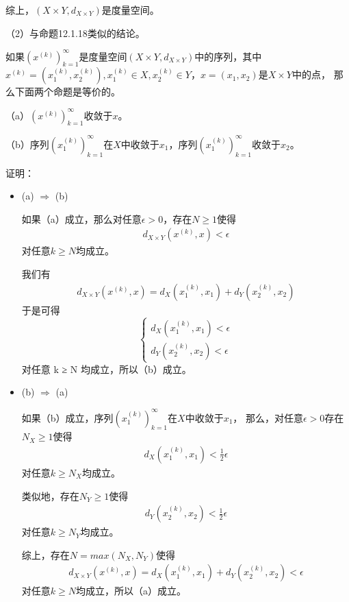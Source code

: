 \documentclass{article}
\begin{document}
综上，$(X \times Y, d_{X \times Y})$是度量空间。

（2）与命题12.1.18类似的结论。

如果$(x^{(k)})_{k = 1}^\infty$是度量空间$(X \times Y, d_{X \times Y})$中的序列，其中
$x^{(k)} = (x_1^{(k)}, x_2^{(k)}), x_1^{(k)} \in X, x_2^{(k)} \in Y$，$x = (x_1, x_2)$是$X \times Y$中的点，
那么下面两个命题是等价的。

（a）$(x^{(k)})_{k = 1}^\infty$收敛于$x$。

（b）序列$(x_1^{(k)})_{k = 1}^\infty$在$X$中收敛于$x_1$，序列$(x_1^{(k)})_{k = 1}^\infty$收敛于$x_2$。

证明：

\begin{itemize}
  \item (a) $\Rightarrow$ (b)

        如果（a）成立，那么对任意$\epsilon > 0$，存在$N \geq 1$使得
        \begin{align*}
          d_{X \times Y}(x^{(k)}, x) < \epsilon
        \end{align*}
        对任意$k \geq N$均成立。

        我们有
        \begin{align*}
          d_{X \times Y}(x^{(k)}, x) = d_X(x_1^{(k)}, x_1) + d_Y(x_2^{(k)}, x_2)
        \end{align*}
        于是可得
        \begin{equation*}
          \begin{cases}
            d_X(x_1^{(k)}, x_1) < \epsilon \\
            d_Y(x_2^{(k)}, x_2) < \epsilon
          \end{cases}
        \end{equation*}
        对任意 k ≥ N 均成立，所以（b）成立。

  \item (b) $\Rightarrow$ (a)

        如果（b）成立，序列$(x_1^{(k)})_{k = 1}^\infty$在$X$中收敛于$x_1$，
        那么，对任意$\epsilon > 0$存在$N_X \geq 1$使得
        \begin{align*}
          d_X(x_1^{(k)}, x_1) < \frac{1}{2} \epsilon
        \end{align*}
        对任意$k \geq N_X$均成立。

        类似地，存在$N_Y \geq 1$使得
        \begin{align*}
          d_Y(x_2^{(k)}, x_2) < \frac{1}{2} \epsilon
        \end{align*}
        对任意$k \geq N_Y$均成立。

        综上，存在$N = max(N_X, N_Y)$使得
        \begin{align*}
          d_{X \times Y}(x^{(k)}, x) = d_X(x_1^{(k)}, x_1) + d_Y(x_2^{(k)}, x_2) < \epsilon
        \end{align*}
        对任意$k \geq N$均成立，所以（a）成立。

\end{itemize}
\end{document}
